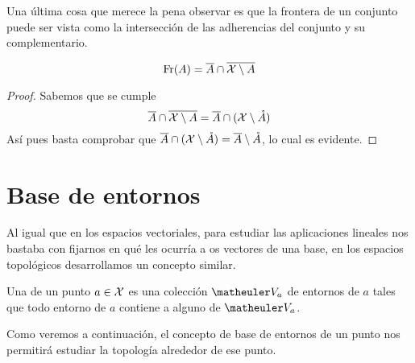 Una última cosa que merece la pena observar es que la frontera de un conjunto puede ser vista como la intersección de las adherencias del conjunto y su complementario.
\begin{lem}
	\begin{equation*}
		\operatorname{\mathrm{Fr}}(A)=\overline{A}\cap\overline{\mathcal{X} \setminus A}
	\end{equation*}
\end{lem}
\begin{proof}
	Sabemos que se cumple
	\begin{equation*}
		\overline{A}\cap\overline{\mathcal{X} \setminus A}=\overline{A}\cap(\mathcal{X} \setminus \mathring{A})
	\end{equation*}
	Así pues basta comprobar que $\overline{A}\cap(\mathcal{X} \setminus \mathring{A})=\overline{A}\setminus \mathring{A}$, lo cual es evidente.
\end{proof}

\section{Base de entornos}
Al igual que en los espacios vectoriales, para estudiar las aplicaciones lineales nos bastaba con fijarnos en qué les ocurría a os vectores de una base, en los espacios topológicos desarrollamos un concepto similar.
\begin{defi}
	\label{etop_bases_entornos}
	Una  de un punto $a\in\mathcal{X}$ es una colección $\Va{a}$ de entornos de $a$ tales que todo entorno de $a$ contiene a alguno de $\Va{a}$.
\end{defi}

Como veremos a continuación, el concepto de base de entornos de un punto nos permitirá estudiar la topología alrededor de ese punto.

